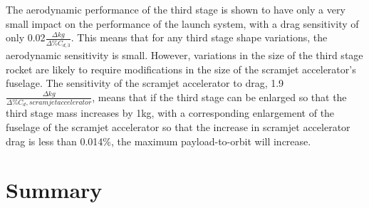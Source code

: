  The aerodynamic performance of the third stage is shown to have only a very small impact on the performance of the launch system, with a drag sensitivity of only 0.02$\frac{\Delta kg}{\Delta\%C_{d,3}}$. This means that for any third stage shape variations, the aerodynamic sensitivity is small.
However, variations in the size of the third stage rocket are likely to require modifications in the size of the scramjet accelerator's fuselage. The sensitivity of the scramjet accelerator to drag, 1.9$\frac{\Delta kg}{\Delta\%C_d,{scramjet accelerator}}$, means that if the third stage can be enlarged so that the third stage mass increases by 1kg, with a corresponding enlargement of the fuselage of the scramjet accelerator so that the increase in scramjet accelerator drag is less than 0.014\%, the maximum payload-to-orbit will increase. 








\section{Summary}


